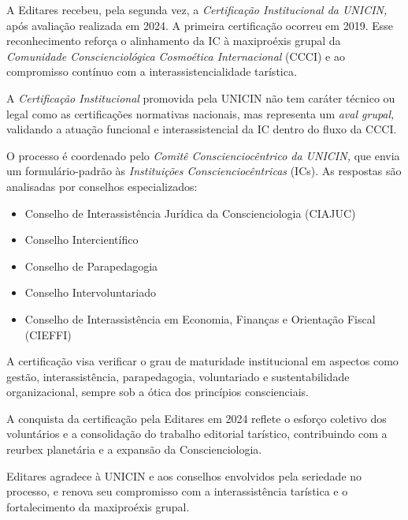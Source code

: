 \documentclass{gescons}
\begin{document}

A Editares recebeu, pela segunda vez, a \emph{Certificação Institucional
da UNICIN,} após avaliação realizada em 2024. A primeira certificação
ocorreu em 2019. Esse reconhecimento reforça o alinhamento da IC à
maxiproéxis grupal da \emph{Comunidade Conscienciológica Cosmoética
Internacional} (CCCI) e ao compromisso contínuo com a
interassistencialidade tarística.

A \emph{Certificação Institucional} promovida pela UNICIN não tem
caráter técnico ou legal como as certificações normativas nacionais, mas
representa um \emph{aval grupal,} validando a atuação funcional e
interassistencial da IC dentro do fluxo da CCCI.

O processo é coordenado pelo \emph{Comitê Conscienciocêntrico da
UNICIN,} que envia um formulário-padrão às \emph{Instituições
Conscienciocêntricas} (ICs). As respostas são analisadas por conselhos
especializados:

\begin{itemize}
\item
  Conselho de Interassistência Jurídica da Conscienciologia (CIAJUC)
\item
  Conselho Intercientífico
\item
  Conselho de Parapedagogia
\item
  Conselho Intervoluntariado
\item
  Conselho de Interassistência em Economia, Finanças e Orientação Fiscal
  (CIEFFI)
\end{itemize}

A certificação visa verificar o grau de maturidade institucional em
aspectos como gestão, interassistência, parapedagogia, voluntariado e
sustentabilidade organizacional, sempre sob a ótica dos princípios
conscienciais.

A conquista da certificação pela Editares em 2024 reflete o esforço
coletivo dos voluntários e a consolidação do trabalho editorial
tarístico, contribuindo com a reurbex planetária e a expansão da
Conscienciologia.

Editares agradece à UNICIN e aos conselhos envolvidos pela seriedade no
processo, e renova seu compromisso com a interassistência tarística e o
fortalecimento da maxiproéxis grupal.





        
\end{document}
